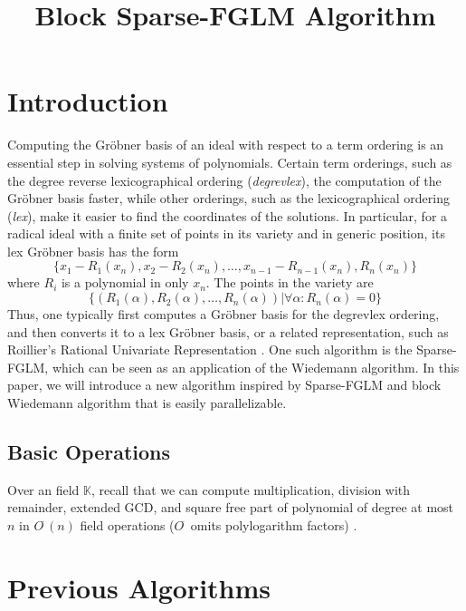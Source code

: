 \documentclass[12pt]{article}
\title{Block Sparse-FGLM Algorithm}
\begin{document}
\tableofcontents
\pagebreak

\section{Introduction}
Computing the Gr\"obner basis of an ideal with respect to a term
ordering is an essential step in solving systems of polynomials. 
Certain term orderings, such as the degree reverse lexicographical 
ordering (\textit{degrevlex}), the computation of the Gr\"obner basis
faster, while other orderings, such as the lexicographical ordering
(\textit{lex}), make it easier to find the coordinates of the solutions.
In particular, for a radical ideal with a finite set of points in its variety
and in generic position, its lex Gr\"obner basis has the form
$$ \{  x_1 - R_1(x_n), x_2-R_2(x_n),\dots, x_{n-1}-R_{n-1}(x_n), R_n(x_n)  \}$$
where $R_i$ is a polynomial in only $x_n$. The points in the variety are
$$\{ ( R_1(\alpha), R_2(\alpha), \dots, R_n(\alpha)  ) |\forall \alpha: R_n(\alpha)=0  \}$$
Thus, one typically first computes a Gr\"obner basis for the degrevlex ordering,
and then converts it to a lex Gr\"obner basis, or a related representation, such as 
Roillier's Rational Univariate Representation \cite{Rouillier99}. One such algorithm is
the Sparse-FGLM, which can be seen as an application
of the Wiedemann algorithm. In this paper, we will
introduce a new algorithm inspired by Sparse-FGLM
and block Wiedemann algorithm that is easily
parallelizable.

\subsection{Basic Operations}
Over an field $\mathbb{K}$,
recall that we can compute multiplication,
division with remainder, extended GCD, and square free part
of polynomial of degree at most $n$ in $O^{\tilde{~}}(n)$
field operations ($O^{\tilde{~}}$ omits polylogarithm factors)
\cite{GaGe13}. 


\newpage
\section{Previous Algorithms}
\end{document}

